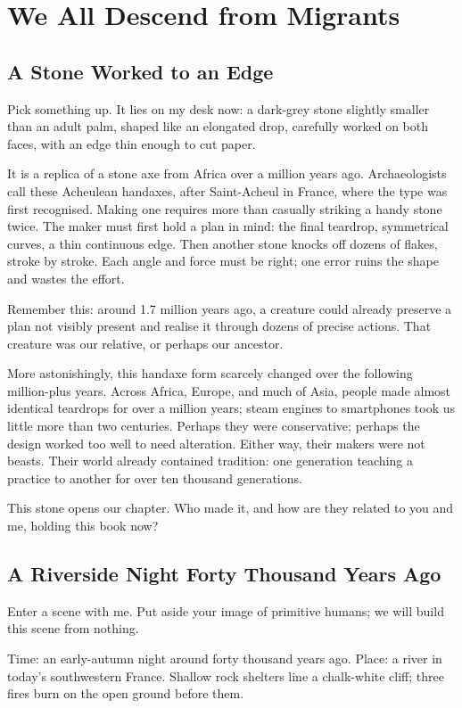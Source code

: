 \chapter{We All Descend from Migrants}
\section{A Stone Worked to an Edge}
Pick something up. It lies on my desk now: a dark-grey stone slightly smaller than an adult palm, shaped like an elongated drop, carefully worked on both faces, with an edge thin enough to cut paper.

It is a replica of a stone axe from Africa over a million years ago. Archaeologists call these Acheulean handaxes, after Saint-Acheul in France, where the type was first recognised. Making one requires more than casually striking a handy stone twice. The maker must first hold a plan in mind: the final teardrop, symmetrical curves, a thin continuous edge. Then another stone knocks off dozens of flakes, stroke by stroke. Each angle and force must be right; one error ruins the shape and wastes the effort.

Remember this: around 1.7 million years ago, a creature could already preserve a plan not visibly present and realise it through dozens of precise actions. That creature was our relative, or perhaps our ancestor.

More astonishingly, this handaxe form scarcely changed over the following million-plus years. Across Africa, Europe, and much of Asia, people made almost identical teardrops for over a million years; steam engines to smartphones took us little more than two centuries. Perhaps they were conservative; perhaps the design worked too well to need alteration. Either way, their makers were not beasts. Their world already contained tradition: one generation teaching a practice to another for over ten thousand generations.

This stone opens our chapter. Who made it, and how are they related to you and me, holding this book now?

\section[A Riverside Night Forty Millennia Ago]{A Riverside Night Forty Thousand Years Ago}
Enter a scene with me. Put aside your image of primitive humans; we will build this scene from nothing.

Time: an early-autumn night around forty thousand years ago. Place: a river in today's southwestern France. Shallow rock shelters line a chalk-white cliff; three fires burn on the open ground before them.

